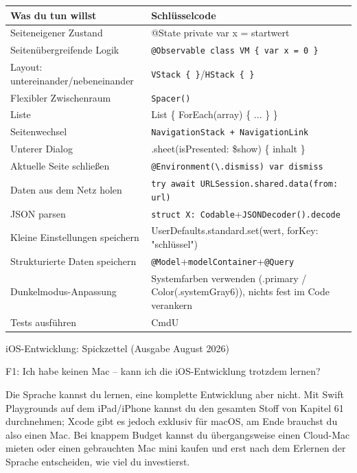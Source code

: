 


\begin{center}
\begin{tabularx}{\linewidth}{|X|X|}
\hline
\textbf{Was du tun willst} & \textbf{Schlüsselcode} \tabularnewline
\hline
Seiteneigener Zustand & @State private var x = startwert \tabularnewline
Seitenübergreifende Logik & \texttt{@Observable class VM \{ var x = 0 \}} \tabularnewline
Layout: untereinander/nebeneinander & \texttt{VStack \{ \}}/\texttt{HStack \{ \}} \tabularnewline
Flexibler Zwischenraum & \texttt{Spacer()} \tabularnewline
Liste & List \{ ForEach(array) \{ ... \} \} \tabularnewline
Seitenwechsel & \texttt{NavigationStack + NavigationLink} \tabularnewline
Unterer Dialog & .sheet(isPresented: \$show) \{ inhalt \} \tabularnewline
Aktuelle Seite schließen & \texttt{@Environment(\textbackslash{}.\allowbreak dismiss) var dismiss} \tabularnewline
Daten aus dem Netz holen & \texttt{try await URLSession.\allowbreak shared.\allowbreak data(from: url)} \tabularnewline
JSON parsen & \texttt{struct X: Codable}+\texttt{JSONDecoder().\allowbreak decode} \tabularnewline
Kleine Einstellungen speichern & UserDefaults.standard.set(wert, forKey: "schlüssel") \tabularnewline
Strukturierte Daten speichern & \texttt{@Model}+\texttt{modelContainer}+\texttt{@Query} \tabularnewline
Dunkelmodus-Anpassung & Systemfarben verwenden (.primary / Color(.systemGray6)), nichts fest im Code verankern \tabularnewline
Tests ausführen & CmdU \tabularnewline
\hline
\end{tabularx}
\end{center}

\begin{center}\small\color{gray}iOS-Entwicklung: Spickzettel (Ausgabe August 2026)\end{center}


F1: Ich habe keinen Mac – kann ich die iOS-Entwicklung trotzdem lernen?

Die Sprache kannst du lernen, eine komplette Entwicklung aber nicht. Mit Swift Playgrounds auf dem iPad/iPhone kannst du den gesamten Stoff von Kapitel 61 durchnehmen; Xcode gibt es jedoch exklusiv für macOS, am Ende brauchst du also einen Mac. Bei knappem Budget kannst du übergangsweise einen Cloud-Mac mieten oder einen gebrauchten Mac mini kaufen und erst nach dem Erlernen der Sprache entscheiden, wie viel du investierst.

